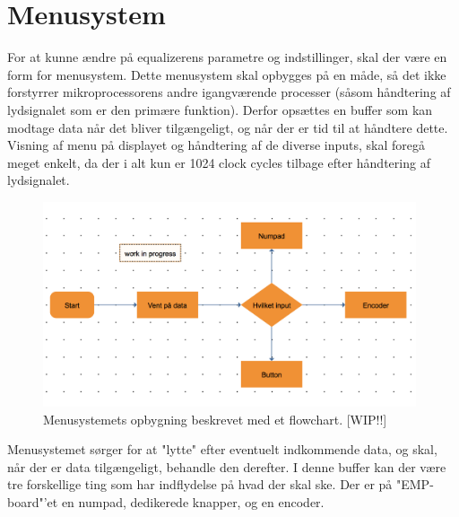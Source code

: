 \section{Menusystem}\label{sec:menu}
For at kunne ændre på equalizerens parametre og indstillinger, skal der være en form for menusystem. Dette menusystem skal opbygges på en måde, så det ikke forstyrrer mikroprocessorens andre igangværende processer (såsom håndtering af lydsignalet som er den primære funktion). Derfor opsættes en buffer som kan modtage data når det bliver tilgængeligt, og når der er tid til at håndtere dette. Visning af menu på displayet og håndtering af de diverse inputs, skal foregå meget enkelt, da der i alt kun er 1024 clock cycles tilbage efter håndtering af lydsignalet. \\

\begin{figure}[h]
	\centering
	\includegraphics[width=11cm]{billeder/ui_flowchart}
	\caption{Menusystemets opbygning beskrevet med et flowchart. [WIP!!]}
\end{figure}

Menusystemet sørger for at "lytte" efter eventuelt indkommende data, og skal, når der er data tilgængeligt, behandle den derefter. I denne buffer kan der være tre forskellige ting som har indflydelse på hvad der skal ske. Der er på "EMP-board"'et en numpad, dedikerede knapper, og en encoder. 